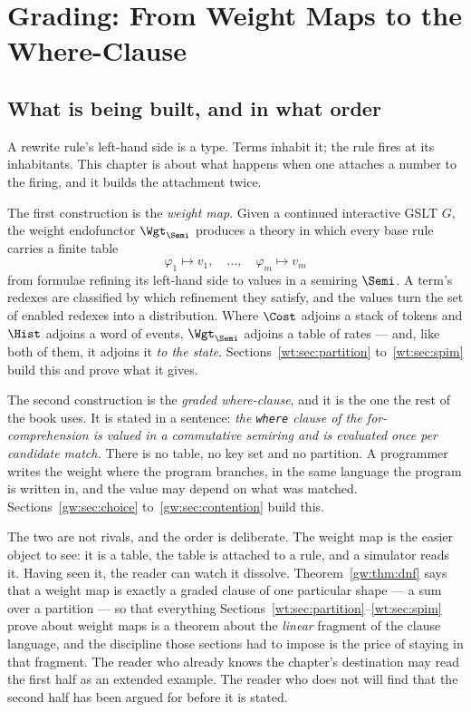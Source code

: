 \chapter{Grading: From Weight Maps to the Where-Clause}
\label{ch:weight}
\label{ch:grading}

\section{What is being built, and in what order}

A rewrite rule's left-hand side is a type. Terms inhabit it; the rule fires at its
inhabitants. This chapter is about what happens when one attaches a number to the
firing, and it builds the attachment twice.

The first construction is the \emph{weight map}. Given a continued interactive GSLT $G$,
the weight endofunctor $\Wgt_{\Semi}$ produces a theory in which every base rule carries a
finite table
\[
  \varphi_1 \mapsto v_1, \quad \ldots, \quad \varphi_m \mapsto v_m
\]
from formulae refining its left-hand side to values in a semiring $\Semi$. A term's
redexes are classified by which refinement they satisfy, and the values turn the set of
enabled redexes into a distribution. Where $\Cost$ adjoins a stack of tokens and $\Hist$
adjoins a word of events, $\Wgt_{\Semi}$ adjoins a table of rates --- and, like both of
them, it adjoins it \emph{to the state}. Sections~\ref{wt:sec:partition}
to~\ref{wt:sec:spim} build this and prove what it gives.

The second construction is the \emph{graded where-clause}, and it is the one the rest of
the book uses. It is stated in a sentence: \emph{the \texttt{where} clause of the
for-comprehension is valued in a commutative semiring and is evaluated once per candidate
match.} There is no table, no key set and no partition. A programmer writes the weight
where the program branches, in the same language the program is written in, and the
value may depend on what was matched.
Sections~\ref{gw:sec:choice} to~\ref{gw:sec:contention} build this.

The two are not rivals, and the order is deliberate. The weight map is the easier object
to see: it is a table, the table is attached to a rule, and a simulator reads it. Having
seen it, the reader can watch it dissolve. Theorem~\ref{gw:thm:dnf} says that a weight map
is exactly a graded clause of one particular shape --- a sum over a partition --- so that
everything Sections~\ref{wt:sec:partition}--\ref{wt:sec:spim} prove about weight maps is
a theorem about the \emph{linear} fragment of the clause language, and the discipline those
sections had to impose is the price of staying in that fragment. The reader who already
knows the chapter's destination may read the first half as an extended example. The reader
who does not will find that the second half has been argued for before it is stated.

